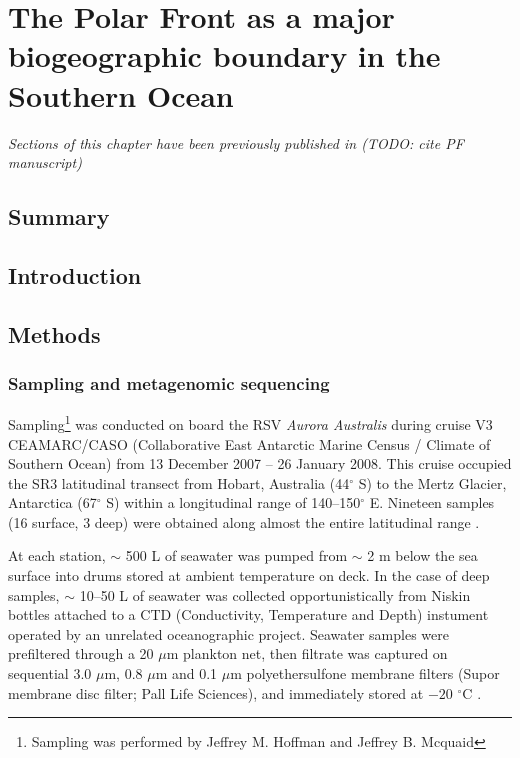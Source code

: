 \chapter{The Polar Front as a major biogeographic boundary in the Southern Ocean} 
\label{ch:polarfront}

\emph{Sections of this chapter have been previously published in (TODO: cite PF manuscript)}

\section{Summary}

\section{Introduction}


\section{Methods}
\subsection{Sampling and metagenomic sequencing}

Sampling\footnote{Sampling was performed by Jeffrey M. Hoffman and Jeffrey B. Mcquaid} was conducted on board the RSV \emph{Aurora Australis} during cruise V3 CEAMARC/CASO (Collaborative East Antarctic Marine Census / Climate of Southern Ocean) from 13 December 2007 -- 26 January 2008. 
This cruise occupied the SR3 latitudinal transect from Hobart, Australia (44$^\circ$ S) to the Mertz Glacier, Antarctica (67$^\circ$ S) within a longitudinal range of 140--150$^\circ$ E.
Nineteen samples (16 surface, 3 deep) were obtained along almost the entire latitudinal range .



At each station, $\sim$ 500 L of seawater was pumped from $\sim$ 2 m below the sea surface into drums stored at ambient temperature on deck. 
In the case of deep samples, $\sim$ 10--50 L of seawater was collected opportunistically from Niskin bottles attached to a CTD (Conductivity, Temperature and Depth) instument operated by an unrelated oceanographic project.
Seawater samples were prefiltered through a 20 $\mu$m plankton net, then filtrate was captured on sequential 3.0 $\mu$m, 0.8 $\mu$m and 0.1 $\mu$m polyethersulfone membrane filters (Supor membrane disc filter; Pall Life Sciences), and immediately stored at $-20$ $^\circ$C \cite{Rusch:2007ez,Ng:2010cd}.


